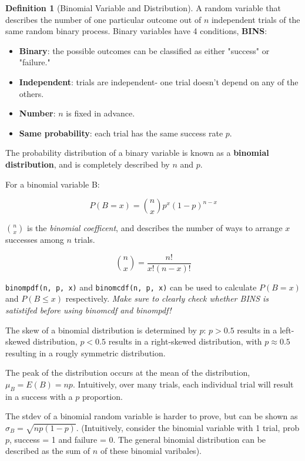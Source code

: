 \documentclass[12pt, a4paper]{article}
\theoremstyle{definition}
\newtheorem{definition}{Definition}
\begin{document}
\begin{definition}[Binomial Variable and Distribution]
    A random variable that describes the number of one particular outcome out of $n$ independent trials of the same random binary process.
    Binary variables have 4 conditions, \textbf{BINS}:
    \begin{itemize}
        \item \textbf{Binary}: the possible outcomes can be classified as either "success" or "failure."
        \item \textbf{Independent}: trials are independent- one trial doesn't depend on any of the others.
        \item \textbf{Number}: $n$ is fixed in advance.
        \item \textbf{Same probability}: each trial has the same success rate $p$.
    \end{itemize}
    The probability distribution of a binary variable is known as a \textbf{binomial distribution}, and is completely described by $n$ and $p$.
\end{definition}

For a binomial variable B:

\[P(B = x) = {n \choose x}p^x(1-p)^{n - x}\]

${n \choose x}$ is the \textit{binomial coefficent}, and describes the number of ways to arrange $x$ successes among $n$ trials.

\[{n \choose x} = \frac{n!}{x!(n - x)!}\]

\verb|binompdf(n, p, x)| and \verb|binomcdf(n, p, x)| can be used to calculate $P(B = x)$ and $P(B \leq x)$ respectively.
\textit{Make sure to clearly check whether BINS is satistifed before using binomcdf and binompdf!}

The skew of a binomial distribution is determined by $p$: $p > 0.5$ results in a left-skewed distribution, $p < 0.5$ results in a right-skewed distribution, with $p \approx 0.5$ resulting in a rougly symmetric distribution.

The peak of the distribution occurs at the mean of the distribution, $\mu_B = E(B) = np$.
Intuitively, over many trials, each individual trial will result in a success with a $p$ proportion.

The stdev of a binomial random variable is harder to prove, but can be shown as $\sigma_B = \sqrt{np(1-p)}$.
(Intuitively, consider the binomial variable with 1 trial, prob $p$, success = 1 and failure = 0.
The general binomial distribution can be described as the sum of $n$ of these binomial varibales).
\end{document}
